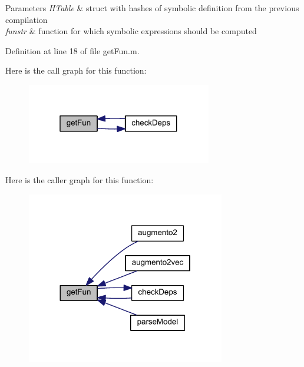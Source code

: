 \begin{DoxyParams}{Parameters}
{\em H\+Table} & struct with hashes of symbolic definition from the previous compilation \\
\hline
{\em funstr} & function for which symbolic expressions should be computed \\
\hline
\end{DoxyParams}


Definition at line 18 of file get\+Fun.\+m.



Here is the call graph for this function\+:
\nopagebreak
\begin{figure}[H]
\begin{center}
\leavevmode
\includegraphics[width=229pt]{classamimodel_a08d58ae650e5ff9310760f6d3f08015c_cgraph}
\end{center}
\end{figure}




Here is the caller graph for this function\+:
\nopagebreak
\begin{figure}[H]
\begin{center}
\leavevmode
\includegraphics[width=245pt]{classamimodel_a08d58ae650e5ff9310760f6d3f08015c_icgraph}
\end{center}
\end{figure}


\hypertarget{classamimodel_ad8b3b7be2def1fea709aaa6f02f04137}{}
